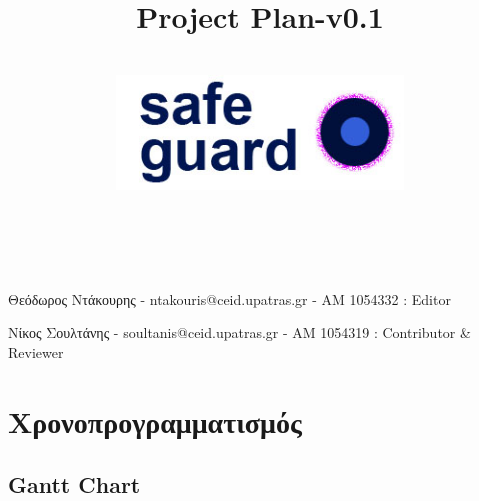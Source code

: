 \documentclass{article}
\title{Project Plan-v0.1}
\author{\\
\includegraphics[width=3in]{safeguard}\\[1ex]\\\\
}
\begin{document}
\maketitle

\newpage


Θεόδωρος Ντάκουρης - ntakouris@ceid.upatras.gr - ΑΜ 1054332 : Editor 


Νίκος Σουλτάνης - soultanis@ceid.upatras.gr - ΑΜ 1054319 : Contributor & Reviewer

\renewcommand{\contentsname}{Περιεχόμενα}
\tableofcontents

\clearpage
\section{Χρονοπρογραμματισμός}
\subsection{Gantt Chart}

\begin{center}
\end{center}
\end{document}
